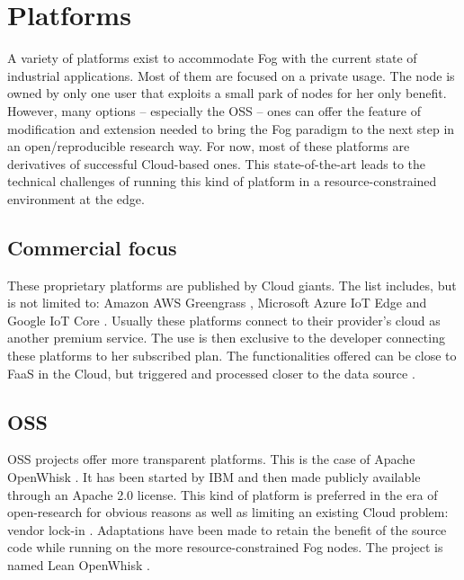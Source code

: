 \section{Platforms}
\label{sec:platforms}

A variety of platforms exist to accommodate Fog with the current state of industrial applications. Most of them are focused on a private usage. The node is owned by only one user that exploits a small park of nodes for her only benefit. However, many options -- especially the \gls{OSS} -- ones can offer the feature of modification and extension needed to bring the Fog paradigm to the next step in an open/reproducible research way. For now, most of these platforms are derivatives of successful Cloud-based ones. This state-of-the-art leads to the technical challenges of running this kind of platform in a resource-constrained environment at the edge.

\subsection{Commercial focus}

These proprietary platforms are published by Cloud giants. The list includes, but is not limited to: Amazon AWS Greengrass \cite{noauthor_aws_nodate}, Microsoft Azure IoT Edge \cite{noauthor_iot_nodate} and Google IoT Core \cite{noauthor_cloud_nodate}. Usually these platforms connect to their provider's cloud as another premium service. The use is then exclusive to the developer connecting these platforms to her subscribed plan. The functionalities offered can be close to \gls{FaaS} in the Cloud, but triggered and processed closer to the data source \cite{elgamal_costless_2018}.

\hypersetup{linkcolor=}
\subsection{\acrfull{OSS}}
\gls{OSS} projects offer more transparent platforms. This is the case of Apache OpenWhisk \cite{noauthor_apache_nodate}. It has been started by IBM and then made publicly available through an Apache 2.0 license. This kind of platform is preferred in the era of open-research for obvious reasons as well as limiting an existing Cloud problem: vendor lock-in \cite{kjorveziroski_iot_2021}. Adaptations have been made to retain the benefit of the source code while running on the more resource-constrained Fog nodes. The project is named Lean OpenWhisk \cite{breitgand_lean_2018}.

